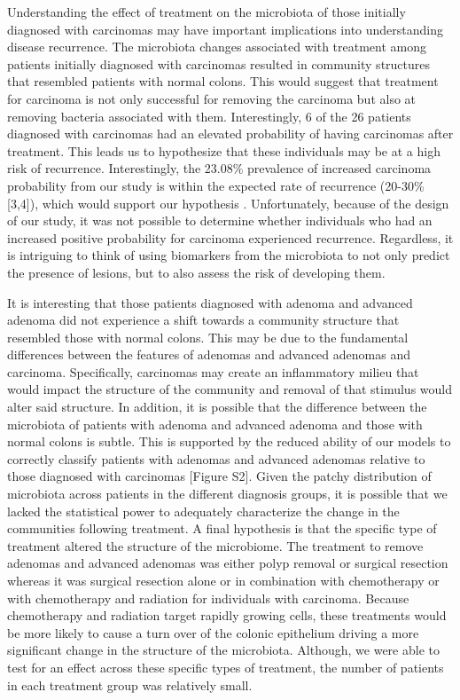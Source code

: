 \documentclass[12pt,]{article}
\begin{document}
Understanding the effect of treatment on the microbiota of those
initially diagnosed with carcinomas may have important implications into
understanding disease recurrence. The microbiota changes associated with
treatment among patients initially diagnosed with carcinomas resulted in
community structures that resembled patients with normal colons. This
would suggest that treatment for carcinoma is not only successful for
removing the carcinoma but also at removing bacteria associated with
them. Interestingly, 6 of the 26 patients diagnosed with carcinomas had
an elevated probability of having carcinomas after treatment. This leads
us to hypothesize that these individuals may be at a high risk of
recurrence. Interestingly, the 23.08\% prevalence of increased carcinoma
probability from our study is within the expected rate of recurrence
(20-30\% {[}3,4{]}), which would support our hypothesis . Unfortunately,
because of the design of our study, it was not possible to determine
whether individuals who had an increased positive probability for
carcinoma experienced recurrence. Regardless, it is intriguing to think
of using biomarkers from the microbiota to not only predict the presence
of lesions, but to also assess the risk of developing them.

It is interesting that those patients diagnosed with adenoma and
advanced adenoma did not experience a shift towards a community
structure that resembled those with normal colons. This may be due to
the fundamental differences between the features of adenomas and
advanced adenomas and carcinoma. Specifically, carcinomas may create an
inflammatory milieu that would impact the structure of the community and
removal of that stimulus would alter said structure. In addition, it is
possible that the difference between the microbiota of patients with
adenoma and advanced adenoma and those with normal colons is subtle.
This is supported by the reduced ability of our models to correctly
classify patients with adenomas and advanced adenomas relative to those
diagnosed with carcinomas {[}Figure S2{]}. Given the patchy distribution
of microbiota across patients in the different diagnosis groups, it is
possible that we lacked the statistical power to adequately characterize
the change in the communities following treatment. A final hypothesis is
that the specific type of treatment altered the structure of the
microbiome. The treatment to remove adenomas and advanced adenomas was
either polyp removal or surgical resection whereas it was surgical
resection alone or in combination with chemotherapy or with chemotherapy
and radiation for individuals with carcinoma. Because chemotherapy and
radiation target rapidly growing cells, these treatments would be more
likely to cause a turn over of the colonic epithelium driving a more
significant change in the structure of the microbiota. Although, we were
able to test for an effect across these specific types of treatment, the
number of patients in each treatment group was relatively small.
\end{document}
